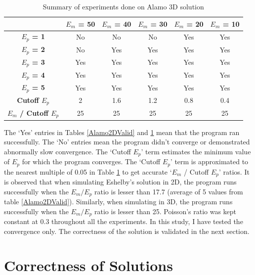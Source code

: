 \documentclass[12pt, a4paper]{report}
\begin{document}
\begin{table}[H]
    \centering
    \begin{tabular}{|c|c|c|c|c|c|}
        \hline
        & \textbf{$E_m$ = 50} &\textbf{$E_m$ = 40}&\textbf{$E_m$ = 30}&\textbf{$E_m$ = 20}&\textbf{$E_m$ = 10}\\
        \hline
        \textbf{$E_p$ = 1} & No & No & No & Yes & Yes\\
        \hline
        \textbf{$E_p$ = 2} & No & Yes & Yes & Yes & Yes\\
        \hline
        \textbf{$E_p$ = 3} & Yes & Yes & Yes & Yes & Yes\\
        \hline
        \textbf{$E_p$ = 4} & Yes & Yes & Yes & Yes & Yes\\
        \hline
        \textbf{$E_p$ = 5} & Yes & Yes & Yes & Yes & Yes\\
        \hline
        \textbf{Cutoff $E_p$} & 2 & 1.6 & 1.2 & 0.8 & 0.4\\
        \hline
        \textbf{$E_m$ / Cutoff $E_p$} & 25 & 25 & 25 & 25 & 25\\
        \hline
    \end{tabular}
    \caption{Summary of experiments done on Alamo 3D solution}
    \label{Alamo3DValid}
\end{table}

The ‘Yes’ entries in Tables \ref{Alamo2DValid} and \ref{Alamo3DValid} mean that the program ran successfully. The ‘No’ entries mean the program didn’t converge or demonstrated abnormally slow convergence. The ‘Cutoff $E_p$’ term estimates the minimum value of $E_p$ for which the program converges. The ‘Cutoff $E_p$’ term is approximated to the nearest multiple of 0.05 in Table \ref{Alamo3DValid} to get accurate ‘$E_m$ / Cutoff $E_p$’ ratios. It is observed that when simulating Eshelby’s solution in 2D, the program runs successfully when the $E_m/E_p$ ratio is lesser than 17.7 (average of 5 values from table \ref{Alamo2DValid}). Similarly, when simulating in 3D, the program runs successfully when the $E_m/E_p$ ratio is lesser than 25. Poisson's ratio was kept constant at 0.3 throughout all the experiments. In this study, I have tested the convergence only. The correctness of the solution is validated in the next section.

\section{Correctness of Solutions}
\end{document}
